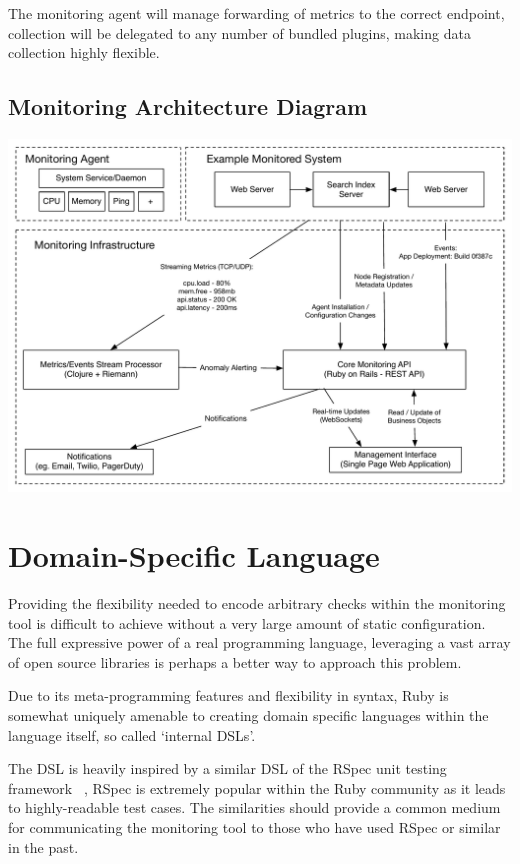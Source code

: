 \documentclass{cshonours}
\begin{document}
The monitoring agent will manage forwarding of metrics to the correct endpoint, collection will be delegated to any number of bundled plugins, making data collection highly flexible.

\begin{landscape}
  \subsection{Monitoring Architecture Diagram}
  \includegraphics[scale=0.7]{architecture.pdf}
\end{landscape}

\pagebreak
\section{Domain-Specific Language}

Providing the flexibility needed to encode arbitrary checks within the monitoring tool is difficult to achieve without a very large amount of static configuration. The full expressive power of a real programming language, leveraging a vast array of open source libraries is perhaps a better way to approach this problem.

Due to its meta-programming features and flexibility in syntax, Ruby is somewhat uniquely amenable to creating domain specific languages within the language itself, so called `internal DSLs'.

The DSL is heavily inspired by a similar DSL of the RSpec unit testing framework
~\cite{RSpec}, RSpec is extremely popular within the Ruby community as it leads to highly-readable test cases. The similarities should provide a common medium for communicating the monitoring tool to those who have used RSpec or similar in the past.
\end{document}
